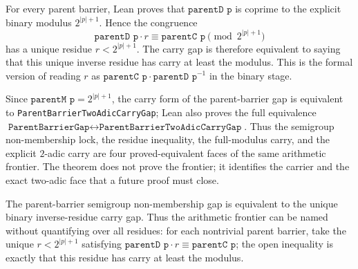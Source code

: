 \begin{theorem}
  \label{thm:collatz-two-adic-unique-residue}
  \leanok
  For every parent barrier, Lean proves that \(\texttt{parentD p}\) is coprime to
  the explicit binary modulus \(2^{|p|+1}\). Hence the congruence
  \[
    \texttt{parentD p}\cdot r \equiv \texttt{parentC p}
      \pmod {2^{|p|+1}}
  \]
  has a unique residue \(r<2^{|p|+1}\). The carry gap is therefore equivalent to
  saying that this unique inverse residue has carry at least the modulus. This is
  the formal version of reading \(r\) as
  \(\texttt{parentC p}\cdot\texttt{parentD p}^{-1}\) in the binary stage.
\end{theorem}
\begin{theorem}
  \label{thm:collatz-two-adic-carry-gap}
  \leanok
  Since \(\texttt{parentM p}=2^{|p|+1}\), the carry form of the parent-barrier gap is
  equivalent to \texttt{ParentBarrierTwoAdicCarryGap}; Lean also proves the full
  equivalence \(\texttt{ParentBarrierGap}\leftrightarrow
  \texttt{ParentBarrierTwoAdicCarryGap}\). Thus the semigroup non-membership lock,
  the residue inequality, the full-modulus carry, and the explicit \(2\)-adic
  carry are four proved-equivalent faces of the same arithmetic frontier. The theorem
  does not prove the frontier; it identifies the carrier and the exact two-adic face
  that a future proof must close.
\end{theorem}
\begin{theorem}
  \label{thm:collatz-two-adic-unique-residue-gap}
  \leanok
  The parent-barrier semigroup non-membership gap is equivalent to the unique
  binary inverse-residue carry gap. Thus the arithmetic frontier can be named
  without quantifying over all residues: for each nontrivial parent barrier, take
  the unique \(r<2^{|p|+1}\) satisfying
  \(\texttt{parentD p}\cdot r\equiv\texttt{parentC p}\); the open inequality is
  exactly that this residue has carry at least the modulus.
\end{theorem}
